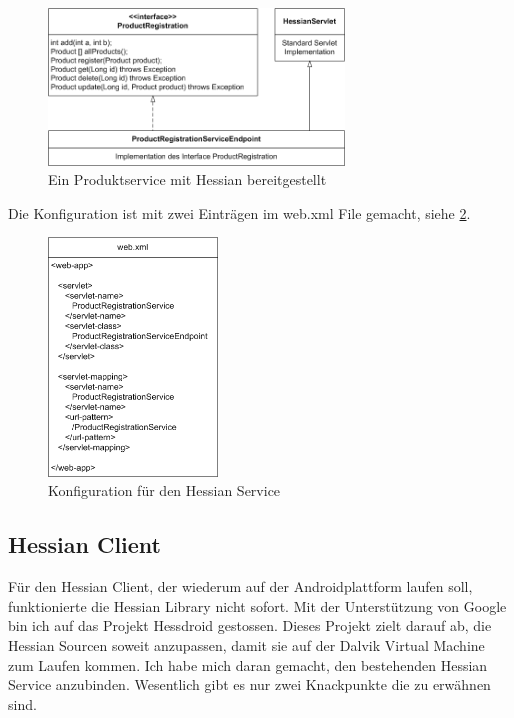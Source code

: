 \documentclass[abstracton, listof=totocnumbered,
bibliography=totocnumbered]{scrreprt}
\begin{document}
  \begin{figure}
    \begin{center}
      \includegraphics[width=0.7\textwidth]{./image/hessian.png}
      \caption{Ein Produktservice mit Hessian bereitgestellt}
      \label{hessianService}
    \end{center}
  \end{figure}
  
  Die Konfiguration ist mit zwei Einträgen im web.xml File gemacht, siehe
  \ref{hessianConfig}.
  
  \begin{figure}
    \begin{center}
      \includegraphics[width=0.4\textwidth]{./image/hessianConfiguration.png}
      \caption{Konfiguration für den Hessian Service}
      \label{hessianConfig}
    \end{center}
  \end{figure}
  
  \subsection{Hessian Client}
  
  Für den Hessian Client, der wiederum auf der Androidplattform laufen soll,
  funktionierte die Hessian Library nicht sofort. Mit der Unterstützung von
  Google bin ich auf das Projekt Hessdroid gestossen. Dieses Projekt zielt
  darauf ab, die Hessian Sourcen soweit anzupassen, damit sie auf der Dalvik
  Virtual Machine zum Laufen kommen. Ich habe mich daran gemacht, den
  bestehenden Hessian Service anzubinden. Wesentlich gibt es nur zwei
  Knackpunkte die zu erwähnen sind.
  
\end{document}
